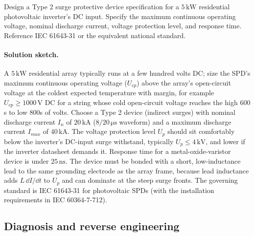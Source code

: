 \begin{exercise}
Design a Type 2 surge protective device specification for a $5\,\si{
\kilo\watt}$ residential photovoltaic inverter's DC input. Specify
the maximum continuous operating voltage, nominal discharge current,
voltage protection level, and response time. Reference IEC 61643-31
or the equivalent national standard.

\paragraph{Solution sketch.} A $5\,\si{\kilo\watt}$ residential array
typically runs at a few hundred volts DC; size the SPD's maximum
continuous operating voltage ($U_{cp}$) above the array's open-circuit
voltage at the coldest expected temperature with margin, for example
$U_{cp} \geq 1000\,\si{\volt}$ DC for a string whose cold open-circuit
voltage reaches the high $600$s to low $800$s of volts. Choose a Type 2
device (indirect surges) with nominal discharge current $I_n$ of
$20\,\si{\kilo\ampere}$ ($8/20\,\si{\micro\second}$ waveform) and a
maximum discharge current $I_{max}$ of $40\,\si{\kilo\ampere}$. The
voltage protection level $U_p$ should sit comfortably below the
inverter's DC-input surge withstand, typically $U_p \leq 4\,\si{\kilo
\volt}$, and lower if the inverter datasheet demands it. Response time
for a metal-oxide-varistor device is under $25\,\si{\nano\second}$. The
device must be bonded with a short, low-inductance lead to the same
grounding electrode as the array frame, because lead inductance adds
$L\,\dd I/\dd t$ to $U_p$ and can dominate at the steep surge fronts.
The governing standard is IEC 61643-31 for photovoltaic SPDs (with the
installation requirements in IEC 60364-7-712).
\end{exercise}

\subsection*{Diagnosis and reverse engineering}

